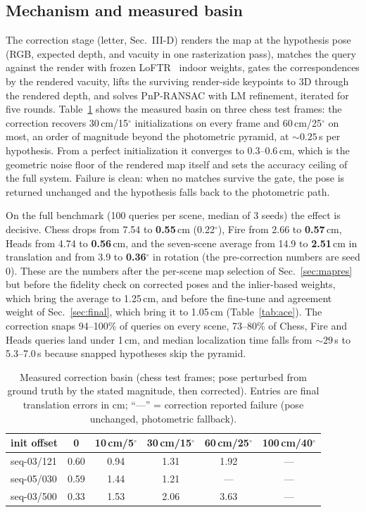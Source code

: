 \documentclass[journal]{IEEEtran}
\begin{document}
\subsection{Mechanism and measured basin}
The correction stage (letter, Sec.~III-D) renders the map at the hypothesis
pose (RGB, expected depth, and vacuity in one rasterization pass), matches
the query against the render with frozen LoFTR~\cite{loftr} indoor weights,
gates the correspondences by the rendered vacuity, lifts the surviving
render-side keypoints to 3D through the rendered depth, and solves PnP-RANSAC with LM refinement, iterated for five rounds.
Table~\ref{tab:corr-basin} shows the measured basin on three chess test
frames: the correction recovers 30\,cm/15$^\circ$ initializations on every
frame and 60\,cm/25$^\circ$ on most, an order of magnitude beyond the
photometric pyramid, at ${\sim}0.25$\,s per hypothesis. From a perfect
initialization it converges to 0.3--0.6\,cm, which is the geometric noise
floor of the rendered map itself and sets the accuracy ceiling of the full
system. Failure is clean: when no matches survive the gate, the pose is
returned unchanged and the hypothesis falls back to the photometric path.

On the full benchmark (100 queries per scene, median of 3 seeds) the effect
is decisive. Chess drops from 7.54 to \textbf{0.55}\,cm (0.22$^\circ$), Fire from 2.66 to \textbf{0.57}\,cm, Heads from 4.74 to \textbf{0.56}\,cm, and the seven-scene average from 14.9 to \textbf{2.51}\,cm in translation and from 3.9 to \textbf{0.36}$^\circ$ in rotation (the pre-correction numbers are seed 0). These are the numbers after the per-scene map selection of Sec.~\ref{sec:mapres} but before the fidelity check on corrected poses and the inlier-based weights, which bring the average to 1.25\,cm, and before the fine-tune and agreement weight of Sec.~\ref{sec:final}, which bring it to 1.05\,cm (Table~\ref{tab:ace}). The correction snaps 94--100\% of queries on every scene, 73--80\% of Chess, Fire and Heads queries land under 1\,cm, and median localization time falls from ${\sim}29$\,s to 5.3--7.0\,s because snapped hypotheses skip the pyramid.

\begin{table}[t]
\caption{Measured correction basin (chess test frames; pose perturbed from
ground truth by the stated magnitude, then corrected). Entries are final
translation errors in cm; ``---'' = correction reported failure (pose
unchanged, photometric fallback).}
\label{tab:corr-basin}
\centering\footnotesize
\setlength{\tabcolsep}{4pt}
\begin{tabular}{@{}lccccc@{}}
\toprule
init offset & 0 & 10\,cm/5$^\circ$ & 30\,cm/15$^\circ$ & 60\,cm/25$^\circ$ & 100\,cm/40$^\circ$ \\
\midrule
seq-03/121 & 0.60 & 0.94 & 1.31 & 1.92 & --- \\
seq-05/030 & 0.59 & 1.44 & 1.21 & ---  & --- \\
seq-03/500 & 0.33 & 1.53 & 2.06 & 3.63 & --- \\
\bottomrule
\end{tabular}
\end{table}
\end{document}
